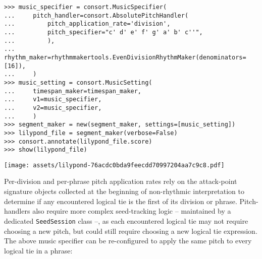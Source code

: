 \begin{abjadbookoutput}
\begin{singlespacing}
\vspace{-0.5\baselineskip}
\begin{lstlisting}
>>> music_specifier = consort.MusicSpecifier(
...     pitch_handler=consort.AbsolutePitchHandler(
...         pitch_application_rate='division',
...         pitch_specifier="c' d' e' f' g' a' b' c''",
...         ),
...     rhythm_maker=rhythmmakertools.EvenDivisionRhythmMaker(denominators=[16]),
...     )
>>> music_setting = consort.MusicSetting(
...     timespan_maker=timespan_maker,
...     v1=music_specifier,
...     v2=music_specifier,
...     )
>>> segment_maker = new(segment_maker, settings=[music_setting])
>>> lilypond_file = segment_maker(verbose=False)
>>> consort.annotate(lilypond_file.score)
>>> show(lilypond_file)
\end{lstlisting}
\noindent\texttt{[image: assets/lilypond-76acdc0bda9feecdd70997204aa7c9c8.pdf]}
\end{singlespacing}
\end{abjadbookoutput}

\noindent Per-division and per-phrase pitch application rates rely on the
attack-point signature objects collected at the beginning of non-rhythmic
interpretation to determine if any encountered logical tie is the first of its
division or phrase. Pitch-handlers also require more complex seed-tracking
logic -- maintained by a dedicated \texttt{SeedSession} class --, as each
encountered logical tie may not require choosing a new pitch, but could still
require choosing a new logical tie expression. The above music specifier can be
re-configured to apply the same pitch to every logical tie in a phrase:

\begin{comment}
<abjad>[stylesheet=../consort.ily]
music_specifier = new(
    music_specifier,
    pitch_handler__pitch_application_rate='phrase',
    )
music_setting = consort.MusicSetting(
    timespan_maker=timespan_maker,
    v1=music_specifier,
    v2=music_specifier,
    )
segment_maker = new(segment_maker, settings=[music_setting])
lilypond_file = segment_maker(verbose=False)
consort.annotate(lilypond_file.score)
show(lilypond_file)
</abjad>
\end{comment}

